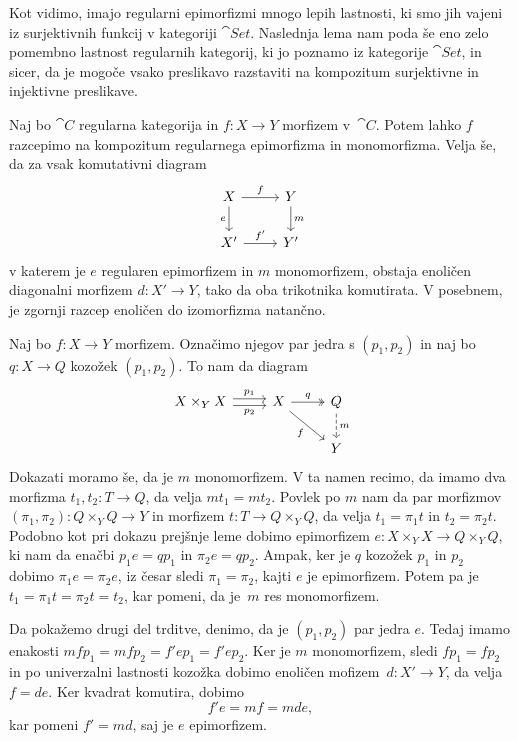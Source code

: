 \documentclass[../kategoricna_logika.tex]{subfiles}
\begin{document}
Kot vidimo, imajo regularni epimorfizmi mnogo lepih lastnosti, ki smo
jih vajeni iz surjektivnih funkcij v kategoriji $\cat{Set}$.
Naslednja lema nam poda še eno zelo pomembno lastnost regularnih kategorij,
ki jo poznamo iz kategorije $\cat{Set}$, in sicer, da je mogoče
vsako preslikavo razstaviti na kompozitum surjektivne in injektivne preslikave.
\begin{lema}
  Naj bo $\cat{C}$ regularna kategorija in $f: X \to Y$ morfizem
  v~$\cat{C}$.  Potem lahko $f$ razcepimo na kompozitum regularnega
  epimorfizma in monomorfizma.  Velja še, da za vsak komutativni
  diagram
  \begin{equation*}
    \begin{tikzcd}
      X \ar[d, "e"'] \ar[r, "f"] & Y \ar[d, "m"] \\
      X' \ar[r, "f'"] & Y'
    \end{tikzcd}
  \end{equation*}
  v katerem je $e$ regularen epimorfizem in $m$ monomorfizem, obstaja
  enoličen diagonalni morfizem $d : X' \to Y$, tako da oba trikotnika
  komutirata.  V posebnem, je zgornji razcep enoličen do izomorfizma
  natančno.
\end{lema}
\begin{comment}
\begin{opomba}
  Pokažimo, da zgornja trditev res pomeni, da so slike morfizmov
  enolične.
\end{opomba}
\end{comment}
\begin{dokaz}
  Naj bo $f : X \to Y$ morfizem.  Označimo njegov par jedra s
  $(p_1, p_2)$ in naj bo$q : X \to Q$ kozožek $(p_1, p_2)$.
  To nam da diagram
  \begin{equation*}
    \begin{tikzcd}
      X \times_Y X \ar[r, shift left, "p_1"] \ar[r, shift right, "p_2"'] &
      X \ar[dr, "f"'] \ar[r, two heads, "q"] & Q \ar[d, dashed, "m"] \\
      & & Y
    \end{tikzcd}
  \end{equation*}
  Dokazati moramo še, da je $m$ monomorfizem. V ta namen recimo, da imamo
  dva morfizma $t_1, t_2 : T \to Q$, da velja $m t_1 = m t_2$. Povlek po
  $m$ nam da par morfizmov $(\pi_1, \pi_2) : Q \times_Y Q \to Y$ in
  morfizem $t : T \to Q \times_Y Q$, da velja $t_1 = \pi_1 t$ in
  $t_2 = \pi_2 t$.  Podobno kot pri dokazu prejšnje leme dobimo
  epimorfizem $e : X \times_Y X \to Q \times_Y Q$, ki nam da enačbi
  $p_1 e = q p_1$ in $\pi_2 e = q p_2$.  Ampak, ker je $q$ kozožek
  $p_1$ in $p_2$ dobimo $\pi_1 e = \pi_2 e$, iz česar sledi
  $\pi_1 = \pi_2$, kajti $e$ je epimorfizem.  Potem pa je
  $t_1 = \pi_1 t = \pi_2 t = t_2$, kar pomeni, da je~$m$ res
  monomorfizem.

  Da pokažemo drugi del trditve, denimo, da je $(p_1, p_2)$ par jedra
  $e$.  Tedaj imamo enakosti
  $m f p_1 = m f p_2 = f' e p_1 = f' e p_2$.  Ker je $m$ monomorfizem,
  sledi $f p_1 = f p_2$ in po univerzalni lastnosti kozožka dobimo
  enoličen mofizem~$d : X' \to Y$, da velja $f = d e$. Ker kvadrat
  komutira, dobimo
  \[f' e = m f = m d e, \]
  kar pomeni $f' = m d$, saj je $e$ epimorfizem.
\end{dokaz}
\end{document}
